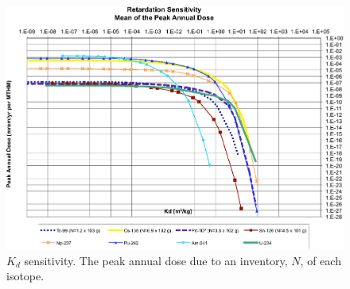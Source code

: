 \begin{figure}[ht]
\centering
\includegraphics[width=0.7\linewidth]{./chapters/nuclide_sensitivity/clay/Sorption/Retardation_Summary_kd.eps}
\caption[$K_d$ sensitivity]{$K_d$ sensitivity.  The peak annual dose due to an inventory, $N$, of each isotope.}
\label{fig:KdSum}
\end{figure}

\FloatBarrier
